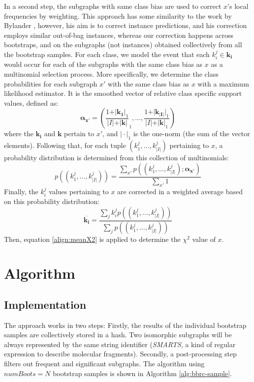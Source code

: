 \documentclass{article}
\begin{document}
In a second step, the subgraphs with same class bias are used to correct $x$'s
local frequencies by weighting. This approach has some similarity to the work
by Bylander \cite{bylander02estimating}, however, his aim is to correct
instance predictions, and his correction employs similar out-of-bag instances,
whereas our correction happens across bootstraps, and on the subgraphs (not
instances) obtained collectively from all the bootstrap samples.  For each
class, we model the event that each $k_i^j \in \mathbf{k_i}$ would occur for
each of the subgraphs with the same class bias as $x$ as a multinomial
selection process.  More specifically, we determine the class probabilities for
each subgraph $x'$ with the same class bias as $x$ with a maximum
likelihood estimator. It is the smoothed vector of relative class specific support
values, defined as:
\begin{equation}
  \mathbf{\alpha_{x'}} = \left(\frac{1+\vert\mathbf{k_1}\vert_1}{\vert I\vert+\vert\mathbf{k}\vert}_1,\ldots,\frac{1+\vert\mathbf{k_{\vert I\vert}}\vert_1}{\vert I\vert+\vert\mathbf{k}\vert_1}\right)
  \label{eqn:mlexpr}
\end{equation}
where the $\mathbf{k_i}$ and $\mathbf{k}$ pertain to $x'$, and $\vert\cdot\vert_1$ is the one-norm (the sum of the vector elements). Following that, for
each tuple $(k_1^j,\ldots,k_{\vert I\vert}^j)$ pertaining to $x$, a probability distribution is
determined from this collection of multinomials:
\begin{equation}
  p((k_1^j,\ldots,k_{\vert I\vert}^j))=\frac{\sum_{x'} p((k_1^j,\ldots,k_{\vert I\vert}^j); \mathbf{\alpha_{x'}})}{\sum_{x'}1}
  \label{eqn:avgpr}
\end{equation}
Finally, the $k_i^j$ values pertaining to $x$ are corrected in a weighted average
based on this probability distribution:
\begin{equation}
  \overline{\mathbf{k_i}}=\frac{\sum_j k_i^j p((k_1^j,\ldots,k_{\vert I\vert}^j))}{\sum_j p((k_1^j,\ldots,k_{\vert I\vert}^j))}
  \label{eqn:avgki}
\end{equation}
Then, equation \ref{align:meanX2} is applied to determine the $\chi^2$ value of $x$.

\section{Algorithm}
\label{s:Algorithm}

\subsection{Implementation}
The approach works in two steps: Firstly, the results of the individual
bootstrap samples are collectively stored in a hash. Two isomorphic subgraphs
will be always represented by the same string identifier (\emph{SMARTS}, a kind
of regular expression to describe molecular fragments). Secondly, a
post-processing step filters out frequent and significant subgraphs. The
algorithm using $numBoots=N$ bootstrap samples is shown in Algorithm
\ref{alg:bbrc-sample}.
\end{document}
